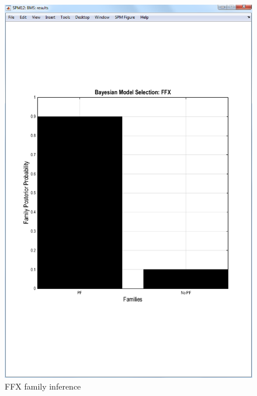 \begin{figure}
\begin{center}
\includegraphics[width=150mm]{bms/Slide5.png}
\caption{FFX family inference\label{family}}
\end{center}
\end{figure}

